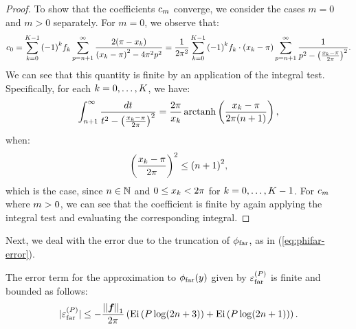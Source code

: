 \begin{proof}
  To show that the coefficients $c_{m}$ converge, we
  consider the cases $m = 0$ and $m > 0$ separately. For $m = 0$, we
  observe that:
  \begin{align*}
    c_{0} = \sum_{{k}=0}^{K{}-1} {(-1)}^k {f}_{k{}} \sum_{p=n+1}^\infty \frac{2(\pi - {x}_{k})}{{({x}_{k} - \pi)}^2 - 4\pi^2p^2} = \frac{1}{2\pi^2} \sum_{{k}=0}^{K{}-1} {(-1)}^k {f}_{k{}} \cdot {({x}_{k} - \pi)} \sum_{p=n+1}^\infty \frac{1}{p^2 - \left(\frac{{x}_{k} - \pi}{2\pi}\right)^2}.
  \end{align*}
  We can see that this quantity is finite by an application of the
  integral test. Specifically, for each
  $k = 0, \hdots, K$, we have:
  \begin{align*}
    \int_{n+1}^\infty \frac{dt}{t^2 - \left(\frac{{x}_{k} - \pi}{2\pi}\right)^2} = \frac{2\pi}{{x}_{k}} \operatorname{arctanh} \left(\frac{{x}_{k} - \pi}{2\pi(n+1)}\right),
  \end{align*}
  when:
  \begin{align*}
    \left(\frac{{x}_{k}-\pi}{2\pi}\right)^2 \leq {(n+1)}^2,
  \end{align*}
  which is the case, since $n \in \mathbb{N}$ and
  $0 \leq {x}_{k} < 2\pi$ for
  $k = 0, \hdots, K-1$. For $c_{m}$ where
  $m > 0$, we can see that the coefficient is finite by again
  applying the integral test and evaluating the corresponding integral.
\end{proof}

Next, we deal with the error due to the truncation of $\phi_{\operatorname{far}}$, as in
(\ref{eq:phifar-error}).

\begin{lemma}\label{lemma:phifar-error}
  The error term for the approximation to $\phi_{\operatorname{far}}(y)$ given by
  ${\varepsilon}^{(P)}_{\operatorname{far}}$ is finite and bounded as follows:
  \begin{align*}
    |{\varepsilon}^{(P)}_{\operatorname{far}}| \leq -\frac{\left|\left|\boldsymbol{{f}_{}}\right|\right|_{1}}{2\pi} \left(\operatorname{Ei} \left(P \log(2n+3)\right) + \operatorname{Ei} \left(P \log(2n+1)\right)\right).
  \end{align*}
\end{lemma}

